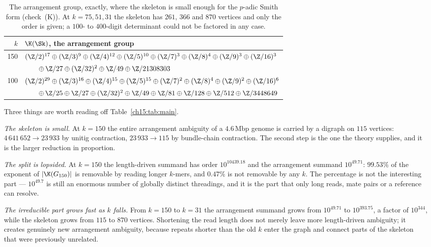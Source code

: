 \begin{table}[ht]
\centering\footnotesize
\begin{tabular}{rl}
\toprule
$k$ & $\K(\Sk)$, the arrangement group\\
\midrule
150 & $(\Z/2)^{17}\oplus(\Z/3)^{9}\oplus(\Z/4)^{12}\oplus(\Z/5)^{10}\oplus(\Z/7)^{3}
\oplus(\Z/8)^{4}\oplus(\Z/9)^{3}\oplus(\Z/16)^{3}$\\
    & $\qquad\oplus\,\Z/27\oplus(\Z/32)^{2}\oplus\Z/49\oplus\Z/21308303$\\[2pt]
100 & $(\Z/2)^{29}\oplus(\Z/3)^{16}\oplus(\Z/4)^{15}\oplus(\Z/5)^{15}\oplus(\Z/7)^{2}
\oplus(\Z/8)^{4}\oplus(\Z/9)^{2}\oplus(\Z/16)^{6}$\\
    & $\qquad\oplus\,\Z/25\oplus\Z/27\oplus(\Z/32)^{2}\oplus\Z/49\oplus\Z/81
\oplus\Z/128\oplus\Z/512\oplus\Z/3448649$\\
\bottomrule
\end{tabular}
\caption{The arrangement group, exactly, where the skeleton is small enough for the
$p$-adic Smith form (check~(K)). At $k=75,51,31$ the skeleton has $261$, $366$ and $870$
vertices and only the order is given; a $100$- to $400$-digit determinant could not be
factored in any case.}
\label{ch15:tab:groups}
\end{table}

\begin{remark}\label{ch15:rem:shape}
Three things are worth reading off Table~\ref{ch15:tab:main}.

\emph{The skeleton is small.} At $k=150$ the entire arrangement ambiguity of a
$4.6$\,Mbp genome is carried by a digraph on $115$ vertices: $4\,641\,652\to23\,933$ by
unitig contraction, $23\,933\to115$ by bundle-chain contraction. The second step is the
one the theory supplies, and it is the larger reduction in proportion.

\emph{The split is lopsided.} At $k=150$ the length-driven summand has order
$10^{10439.18}$ and the arrangement summand $10^{49.71}$: $99.53\%$ of the exponent of
$|\K(G_{150})|$ is removable by reading longer $k$-mers, and $0.47\%$ is not removable by
any $k$. The percentage is not the interesting part --- $10^{49.7}$ is still an enormous
number of globally distinct threadings, and it is the part that only long reads, mate
pairs or a reference can resolve.

\emph{The irreducible part grows fast as $k$ falls.} From $k=150$ to $k=31$ the
arrangement summand grows from $10^{49.71}$ to $10^{393.75}$, a factor of $10^{344}$,
while the skeleton grows from $115$ to $870$ vertices. Shortening the read length does
not merely leave more length-driven ambiguity; it creates genuinely new arrangement
ambiguity, because repeats shorter than the old $k$ enter the graph and connect parts of
the skeleton that were previously unrelated.
\end{remark}

